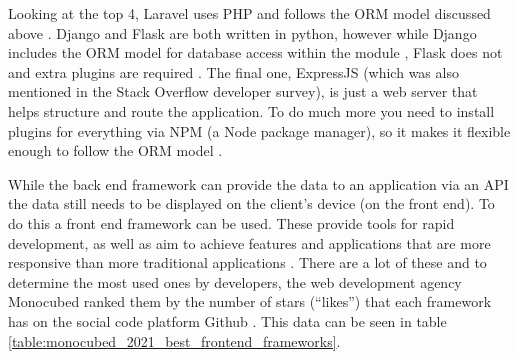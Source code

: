 \documentclass{UoYCSproject}
\begin{document}
Looking at the top 4, Laravel uses PHP and follows the ORM model discussed above \cite{otwell_2015}. Django and Flask are both written in python, however while Django includes the ORM model for database access within the module \cite{django_docs}, Flask does not and extra plugins are required \cite{flask_docs}. The final one, ExpressJS (which was also mentioned in the Stack Overflow developer survey), is just a web server that helps structure and route the application. To do much more you need to install plugins for everything via NPM (a Node package manager), so it makes it flexible enough to follow the ORM model \cite{vivah_2019}. 

While the back end framework can provide the data to an application via an API the data still needs to be displayed on the client's device (on the front end). To do this a front end framework can be used. These provide tools for rapid development, as well as aim to achieve features and applications that are more responsive than more traditional applications \cite{monocubed_2021_best_frontend_frameworks}. There are a lot of these and to determine the most used ones by developers, the web development agency Monocubed ranked them by the number of stars (“likes”) that each framework has on the social code platform Github \cite{monocubed_2021_best_frontend_frameworks}. This data can be seen in table \ref{table:monocubed_2021_best_frontend_frameworks}.


\begin{table}[H]
\begin{center}
\label{table:monocubed_2021_best_frontend_frameworks}
\caption{ The number of Github stars of popular front end frameworks front end frameworks 
\protect\cite{monocubed_2021_best_frontend_frameworks} }

\end{center}
\end{table}
\end{document}
